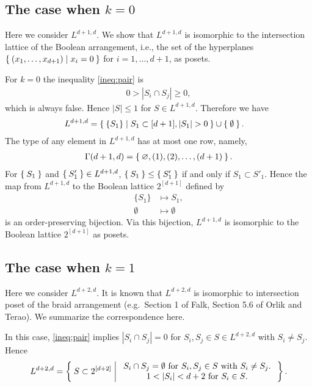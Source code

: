 \documentclass{wstmp}
\begin{document}
\subsection{The case when $k=0$}
Here we consider $L^{d+1,d}$.
We show that
$L^{d+1,d}$
is isomorphic to the intersection lattice of
the Boolean arrangement, i.e., 
the set of the hyperplanes
$\Set{(x_1,\ldots,x_{d+1})|x_i=0}$ for $i=1,\ldots,d+1$,
as posets.

For $k=0$ the inequality \eqref{ineq:pair} is
\begin{align*}
0>{\left|{S_i \cap S_j}\right|}\geq 0,
\end{align*}
which is always false.
Hence ${\left|{S}\right|}\leq 1$ for  $S \in L^{d+1,d}$.
Therefore we have
\begin{align*}
L^{d+1,d}
&=\Set{\{S_1\} | S_1\subset [d+1], {\left|{S_1}\right|}>0} \cup \Set{\emptyset}.
\end{align*}
The type of any element 
in  $L^{d+1,d}$
has at most one row,
namely,
\begin{align*}
\Gamma(d+1,d)=\Set{{\varnothing},(1),(2),\ldots,(d+1)}.
\end{align*}
For $\Set{S_1}$ and $\Set{S'_1} \in L^{d+1,d}$,
$\Set{S_1} \leq \Set{S'_1}  $
if and only if $S_1 \subset S'_1$.
Hence the map from $L^{d+1,d}$ to 
the Boolean lattice $2^{[d+1]}$ defined by
\begin{align*}
\{S_1\}   &\mapsto S_1,\\
\emptyset &\mapsto \emptyset
\end{align*}
is an order-preserving bijection.
Via this bijection,
 $L^{d+1,d}$ is isomorphic to
the Boolean lattice $2^{[d+1]}$
as posets.

\subsection{The case when $k=1$}
Here we consider $L^{d+2,d}$.
It is known that 
$L^{d+2,d}$ is isomorphic 
to intersection poset of the braid arrangement (e.g.\ Section 1 of
Falk\cite{falk1994}, Section 5.6 of Orlik and Terao\cite{orlik-terao-book}).
We summarize the correspondence here.

In this case, \eqref{ineq:pair} implies
${\left|{S_i \cap S_j}\right|} = 0$ for 
$S_i, S_j \in S \in L^{d+2,d}$ with $S_i \neq S_j$.
Hence 
\begin{align*}
 L^{d+2,d}=
\Set{
 S \subset 2^{[d+2]} | 
 \begin{array}{c}
 \text{$S_i\cap S_j = \emptyset$ for $S_i,S_j \in S$ with $S_i\neq S_j$.}\\
 \text{$1<{\left|{S_i}\right|}<d+2$ for $S_i \in S$.} 
 \end{array}
}.
\end{align*}
\end{document}
